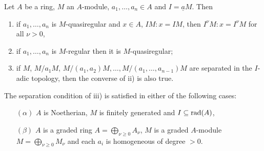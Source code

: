 \documentclass[../main]{subfiles}
\begin{document}
\begin{theorem}\label{thm:027}
Let $A$ be a ring, $M$ an $A$-module, $a_1,\ldots,a_n\in A$ and $I=\underline{a}M$. Then
\begin{enumerate}
    \item if $a_1,\ldots,a_n$ is $M$-quasiregular and $x\in A$, $IM:x=IM$, then \newline $I^\nu M:x=I^\nu M$ for all $\nu>0$,
    \item if $a_1,\ldots,a_n$ is $M$-regular then it is $M$-quasiregular;
    \item if $M$, $M/a_1M$, $M/(a_1,a_2)M, \ldots, M/(a_1,\ldots,a_{n-1})M$ are separated in the $I$-adic topology, then the converse of ii) is also true.
\end{enumerate}
\end{theorem}

\begin{remark}
The separation condition of iii) is satisfied in either of the following cases:
\begin{enumerate}
    \item[$(\alpha)$] $A$ is Noetherian, $M$ is finitely generated and $I\subseteq\operatorname{rad}(A)$, 
    \item[$(\beta)$] $A$ is a graded ring $A=\bigoplus_{\nu\geqslant0}A_\nu$, $M$ is a graded $A$-module $M=\bigoplus_{\nu\geqslant0}M_\nu$ and each $a_i$ is homogeneous of degree $>0$.
\end{enumerate}
\end{remark}
\end{document}
